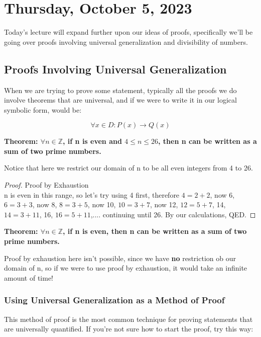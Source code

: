 \section{Thursday, October 5, 2023}
Today's lecture will expand further upon our ideas of proofs, specifically we'll be going over proofs involving universal generalization and divisibility of numbers.

\subsection{Proofs Involving Universal Generalization}
When we are trying to prove some statement, typically all the proofs we do involve theorems that are universal, and if we were to write it in our logical symbolic form, would be:

\begin{displaymath}
\forall x \in D : P(x) \rightarrow Q(x)
\end{displaymath}

\begin{example}
\textbf{Theorem: $\forall n \in \mathbb{Z}$, if n is even and $4 \leq n \leq 26$, then n can be written as a sum of two prime numbers.}
\end{example}

Notice that here we restrict our domain of n to be all even integers from 4 to 26.

\begin{proof}
Proof by Exhaustion\\
n is even in this range, so let's try using 4 first, therefore $4=2+2$, now 6, $6=3+3$, now 8, $8=3+5$, now 10, $10=3+7$, now 12, $12 = 5+7$, 14, $14=3+11$, 16, $16=5+11$,.... continuing until 26. By our calculations, QED.
\end{proof}

\begin{example}
\textbf{Theorem: $\forall n \in \mathbb{Z}$, if n is even, then n can be written as a sum of two prime numbers.}
\end{example}

Proof by exhaustion here isn't possible, since we have \textbf{no} restriction ob our domain of n, so if we were to use proof by exhaustion, it would take an infinite amount of time!

\subsubsection{Using Universal Generalization as a Method of Proof}
This method of proof is the most common technique for proving statements that are universally quantified. If you're not sure how to start the proof, try this way:

